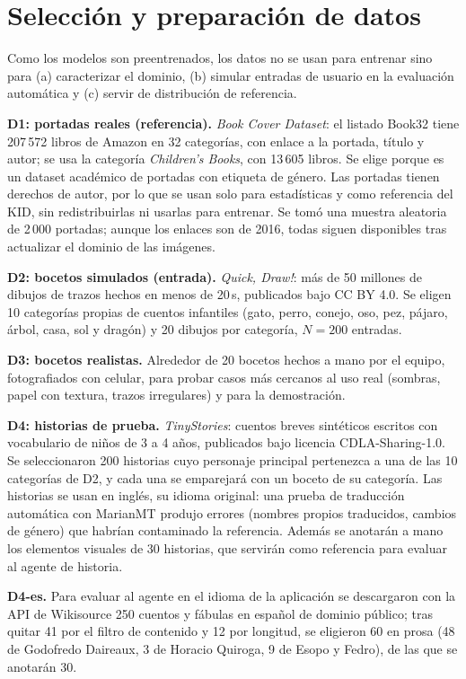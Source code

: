 \documentclass[10pt,a4paper,twocolumn]{article}
\begin{document}
\section{Selección y preparación de datos}\label{sec:datos}
Como los modelos son preentrenados, los datos no se usan para entrenar sino para (a) caracterizar el dominio, (b) simular entradas de usuario en la evaluación automática y (c) servir de distribución de referencia.

\textbf{D1: portadas reales (referencia).} \emph{Book Cover Dataset}: el listado Book32 tiene 207\,572 libros de Amazon en 32 categorías, con enlace a la portada, título y autor; se usa la categoría \emph{Children's Books}, con 13\,605 libros. Se elige porque es un dataset académico de portadas con etiqueta de género. Las portadas tienen derechos de autor, por lo que se usan solo para estadísticas y como referencia del KID, sin redistribuirlas ni usarlas para entrenar. Se tomó una muestra aleatoria de 2\,000 portadas; aunque los enlaces son de 2016, todas siguen disponibles tras actualizar el dominio de las imágenes.

\textbf{D2: bocetos simulados (entrada).} \emph{Quick, Draw!}: más de 50 millones de dibujos de trazos hechos en menos de 20\,s, publicados bajo CC BY 4.0. Se eligen 10 categorías propias de cuentos infantiles (gato, perro, conejo, oso, pez, pájaro, árbol, casa, sol y dragón) y 20 dibujos por categoría, $N=200$ entradas.

\textbf{D3: bocetos realistas.} Alrededor de 20 bocetos hechos a mano por el equipo, fotografiados con celular, para probar casos más cercanos al uso real (sombras, papel con textura, trazos irregulares) y para la demostración.

\textbf{D4: historias de prueba.} \emph{TinyStories}: cuentos breves sintéticos escritos con vocabulario de niños de 3 a 4 años, publicados bajo licencia CDLA-Sharing-1.0. Se seleccionaron 200 historias cuyo personaje principal pertenezca a una de las 10 categorías de D2, y cada una se emparejará con un boceto de su categoría. Las historias se usan en inglés, su idioma original: una prueba de traducción automática con MarianMT produjo errores (nombres propios traducidos, cambios de género) que habrían contaminado la referencia. Además se anotarán a mano los elementos visuales de 30 historias, que servirán como referencia para evaluar al agente de historia.

\textbf{D4-es.} Para evaluar al agente en el idioma de la aplicación se descargaron con la API de Wikisource 250 cuentos y fábulas en español de dominio público; tras quitar 41 por el filtro de contenido y 12 por longitud, se eligieron 60 en prosa (48 de Godofredo Daireaux, 3 de Horacio Quiroga, 9 de Esopo y Fedro), de las que se anotarán 30.
\end{document}

